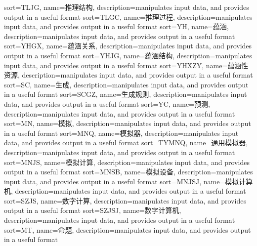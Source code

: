 {
  sort=TLJG,
  name=推理结构,
  description={manipulates input data, and provides output in a useful format}
}
{
  sort=TLGC,
  name=推理过程,
  description={manipulates input data, and provides output in a useful format}
}
{
  sort=YH,
  name=蕴涵,
  description={manipulates input data, and provides output in a useful format}
}
{
  sort=YHGX,
  name=蕴涵关系,
  description={manipulates input data, and provides output in a useful format}
}
{
  sort=YHJG,
  name=蕴涵结构,
  description={manipulates input data, and provides output in a useful format}
}
{
  sort=YHXZY,
  name=蕴涵性资源,
  description={manipulates input data, and provides output in a useful format}
}
{
  sort=SC,
  name=生成,
  description={manipulates input data, and provides output in a useful format}
}
{
  sort=SCGZ,
  name=生成规则,
  description={manipulates input data, and provides output in a useful format}
}
{
  sort=YC,
  name=预测,
  description={manipulates input data, and provides output in a useful format}
}
{
  sort=MN,
  name=模拟,
  description={manipulates input data, and provides output in a useful format}
}
{
  sort=MNQ,
  name=模拟器,
  description={manipulates input data, and provides output in a useful format}
}
{
  sort=TYMNQ,
  name=通用模拟器,
  description={manipulates input data, and provides output in a useful format}
}
{
  sort=MNJS,
  name=模拟计算,
  description={manipulates input data, and provides output in a useful format}
}
{
  sort=MNSB,
  name=模拟设备,
  description={manipulates input data, and provides output in a useful format}
}
{
  sort=MNJSJ,
  name=模拟计算机,
  description={manipulates input data, and provides output in a useful format}
}
{
  sort=SZJS,
  name=数字计算,
  description={manipulates input data, and provides output in a useful format}
}
{
  sort=SZJSJ,
  name=数字计算机,
  description={manipulates input data, and provides output in a useful format}
}
{
  sort=MT,
  name=命题,
  description={manipulates input data, and provides output in a useful format}
}

